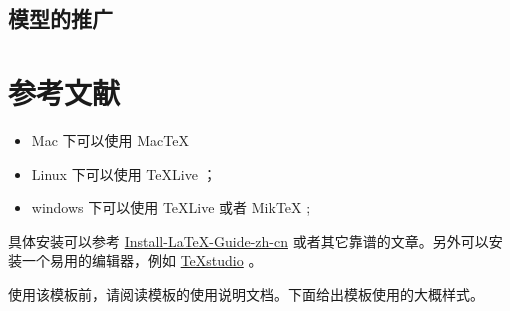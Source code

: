 \documentclass[withoutpreface,bwprint]{cumcmthesis} %
\begin{document}
\subsection{模型的推广}
\section{参考文献}
\begin{itemize}
    \item Mac 下可以使用 Mac\TeX{}
    \item Linux 下可以使用 \TeX{}Live ；
    \item windows 下可以使用 \TeX{}Live 或者 Mik\TeX{} ;
\end{itemize}

具体安装可以参考 \href{https://github.com/OsbertWang/install-latex-guide-zh-cn/releases/}{Install-LaTeX-Guide-zh-cn} 或者其它靠谱的文章。另外可以安装一个易用的编辑器，例如 \href{https://mirrors.tuna.tsinghua.edu.cn/github-release/texstudio-org/texstudio/LatestRelease/}{\TeX{}studio} 。

使用该模板前，请阅读模板的使用说明文档。下面给出模板使用的大概样式。
\end{document}
